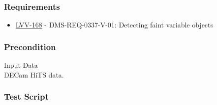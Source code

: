 \hypertarget{requirements-57}{%
\subsubsection{Requirements}\label{requirements-57}}

\begin{itemize}
\tightlist
\item
  \href{https://jira.lsstcorp.org/browse/LVV-168}{LVV-168} -
  DMS-REQ-0337-V-01: Detecting faint variable objects
\end{itemize}

\hypertarget{precondition-9}{%
\subsubsection{Precondition}\label{precondition-9}}

Input Data\\
DECam HiTS data.

\hypertarget{test-script-57}{%
\subsubsection{Test Script}\label{test-script-57}}

